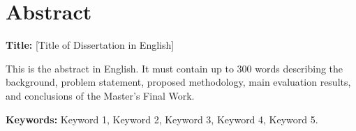 \chapter*{Abstract}

{\bfseries Title:} [Title of Dissertation in English]

\vspace{0.5cm}

This is the abstract in English. It must contain up to 300 words describing the background, problem statement, proposed methodology, main evaluation results, and conclusions of the Master's Final Work.

\vspace{1cm}

\noindent\textbf{Keywords:} Keyword 1, Keyword 2, Keyword 3, Keyword 4, Keyword 5.
\newpage
